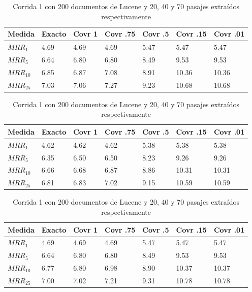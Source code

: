 \begin{table}
\centering
\begin{center}
\begin{tabular}{|l | l | l | l | l | l | l |}
\hline
Medida & Exacto & Covr 1 & Covr .75 & Covr .5 & Covr .15 & Covr .01 \\ \hline
$MRR_{1}$ & 4.69 & 4.69 & 4.69 & 5.47 & 5.47 & 5.47  \\ \hline
$MRR_{5}$ & 6.64 & 6.80 & 6.80 & 8.49 & 9.53 & 9.53  \\ \hline
$MRR_{10}$ & 6.85 & 6.87 & 7.08 & 8.91 & 10.36 & 10.36  \\ \hline
$MRR_{25}$ & 7.03 & 7.06 & 7.27 & 9.23 & 10.68 & 10.68  \\ \hline
\end{tabular}

\medskip

\begin{tabular}{|l | l | l | l | l | l | l |}
\hline
Medida & Exacto & Covr 1 & Covr .75 & Covr .5 & Covr .15 & Covr .01 \\ \hline
$MRR_{1}$ & 4.62 & 4.62 & 4.62 & 5.38 & 5.38 & 5.38  \\ \hline
$MRR_{5}$ & 6.35 & 6.50 & 6.50 & 8.23 & 9.26 & 9.26  \\ \hline
$MRR_{10}$ & 6.66 & 6.68 & 6.87 & 8.86 & 10.31 & 10.31  \\ \hline
$MRR_{25}$ & 6.81 & 6.83 & 7.02 & 9.15 & 10.59 & 10.59  \\ \hline
\end{tabular}

\medskip

\begin{tabular}{|l | l | l | l | l | l | l |}
\hline
Medida & Exacto & Covr 1 & Covr .75 & Covr .5 & Covr .15 & Covr .01 \\ \hline
$MRR_{1}$ & 4.69 & 4.69 & 4.69 & 5.47 & 5.47 & 5.47  \\ \hline
$MRR_{5}$ & 6.64 & 6.80 & 6.80 & 8.49 & 9.53 & 9.53  \\ \hline
$MRR_{10}$ & 6.77 & 6.80 & 6.98 & 8.90 & 10.37 & 10.37  \\ \hline
$MRR_{25}$ & 7.00 & 7.02 & 7.21 & 9.31 & 10.78 & 10.78  \\ \hline
\end{tabular}
\caption{Corrida 1 con 200 documentos de Lucene y 20, 40 y 70 pasajes extraídos respectivamente}
\label{table:1_200_getExactMRRWikiFactoid_getCovrMRRWikiFactoid}
\end{center}
\end{table}

